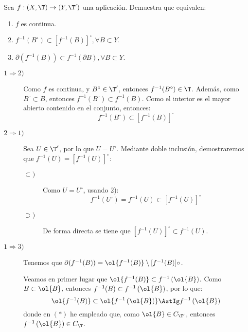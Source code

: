 \begin{ejercicio}
    Sea $f : (X, \T ) \to (Y, \T')$ una aplicación. Demuestra que equivalen:
\begin{enumerate}
    \item $f$ es continua.
    \item $f^{-1}(B^\circ) \subset [f^{-1}(B)]^\circ, \forall B \subset Y$.
    \item $\partial (f^{-1}(B)) \subset f^{-1}(\partial B), \forall B \subset Y$.
\end{enumerate}
\begin{description}
    \item[$1 \Longrightarrow 2)$]

    Como $f$ es continua, y $B^\circ \in \T'$, entonces $f^{-1}(B^\circ)\in \T$. Además, como $B^\circ \subset B$, entonces $f^{-1}(B^\circ)\subset f^{-1}(B)$. Como el interior es el mayor abierto contenido en el conjunto, entonces:
    \begin{equation*}
        f^{-1}(B^\circ) \subset [f^{-1}(B)]^\circ
    \end{equation*}

    \item[$2 \Longrightarrow 1)$] Sea $U\in \T'$, por lo que $U=U^\circ$. Mediante doble inclusión, demostraremos que $f^{-1}(U)=[f^{-1}(U)]^\circ$:
    \begin{description}
        \item[$\subset)$] Como $U=U^\circ$, usando 2):
        \begin{equation*}
            f^{-1}(U^\circ) = f^{-1}(U) \subset [f^{-1}(U)]^\circ
        \end{equation*}

        \item[$\supset)$] De forma directa se tiene que $[f^{-1}(U)]^\circ \subset f^{-1}(U)$.
    \end{description}

    \item[$1\Longrightarrow 3)$] Tenemos que $\partial (f^{-1}(B)) = \ol{f^{-1}(B)}\setminus [f^{-1}(B)]\circ$.

    Veamos en primer lugar que $\ol{f^{-1}(B)}\subset f^{-1}\left(\ol{B}\right)$. Como $B\subset \ol{B}$, entonces $f^{-1}(B)\subset f^{-1}\left(\ol{B}\right)$, por lo que:
    \begin{equation*}
        \ol{f^{-1}(B)}\subset \ol{f^{-1}\left(\ol{B}\right)} \AstIg f^{-1}\left(\ol{B}\right)
    \end{equation*}
    donde en $(\ast)$ he empleado que, como $\ol{B}\in C_{\T'}$, entonces $f^{-1}\left(\ol{B}\right)\in C_\T$.


\end{description}
\end{ejercicio}
